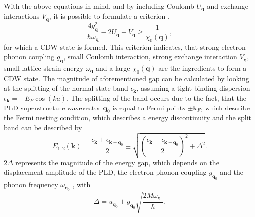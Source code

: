 With the above equations in mind, and by including Coulomb $U_\mathbf{q}$ and exchange interactions $V_\mathbf{q}$, it is possible to formulate a criterion \cite{chan_spin_1973}.
\begin{equation}
	\frac{4g_\mathbf{q}^2}{\hbar\omega_\mathbf{q}}-2U_\mathbf{q}+V_\mathbf{q}\geq\frac{1}{\chi_0(\mathbf{q})},
\end{equation}
for which a CDW state is formed.
This criterion indicates, that strong electron-phonon coupling $g_\mathbf{q}$, small Coulomb interaction, strong exchange interaction $V_\mathbf{q}$, small lattice strain energy $\omega_\mathbf{q}$ and a large $\chi_0(\mathbf{q})$ are the ingredients to form a CDW state.
The magnitude of aforementioned gap can be calculated by looking at the splitting of the normal-state band $\epsilon_\mathbf{k}$, assuming a tight-binding dispersion $\epsilon_\mathbf{k}=-E_F\cos(ka)$.
The splitting of the band occurs due to the fact, that the PLD superstructure wavevector $\mathbf{q}_0$ is equal to Fermi points $\pm\mathbf{k}_F$, which describe the Fermi nesting condition, which describes a energy discontinuity and the split band can be described by
\begin{equation}
	E_{1,2}(\mathbf{k})=\frac{\epsilon_{\mathbf{k}}+\epsilon_{\mathbf{k}+\mathbf{q}_0}}{2}\pm\sqrt{\left( \frac{\epsilon_{\mathbf{k}}+\epsilon_{\mathbf{k}+\mathbf{q}_0}}{2}\right)^2 + \Delta^2 }.
	\label{eq:cdw_splitting}
\end{equation}
$2\Delta$ represents the magnitude of the energy gap, which depends on the displacement amplitude of the PLD, the electron-phonon coupling $g_{\mathbf{q}_0}$ and the phonon frequency $\omega_{\mathbf{q}_0}$ \cite{gruner_density_2019}, with
\begin{equation}
	\Delta=u_{\mathbf{q}_0} + g_{\mathbf{q}_0} \sqrt{\frac{2M\omega_{\mathbf{q}_0}}{\hbar}}.
\end{equation}

